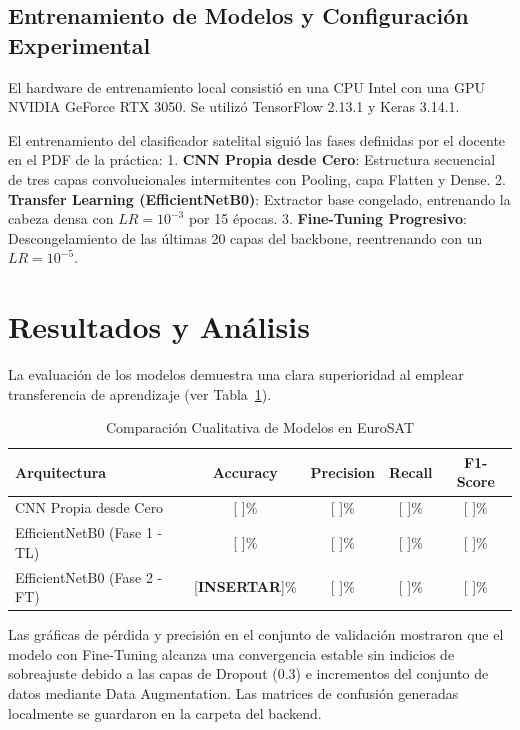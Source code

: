 \documentclass[conference,onecolumn]{IEEEtran}
\begin{document}
\subsection{Entrenamiento de Modelos y Configuración Experimental}
El hardware de entrenamiento local consistió en una CPU Intel con una GPU NVIDIA GeForce RTX 3050. Se utilizó TensorFlow 2.13.1 y Keras 3.14.1.

El entrenamiento del clasificador satelital siguió las fases definidas por el docente en el PDF de la práctica:
1.  \textbf{CNN Propia desde Cero}: Estructura secuencial de tres capas convolucionales intermitentes con Pooling, capa Flatten y Dense.
2.  \textbf{Transfer Learning (EfficientNetB0)}: Extractor base congelado, entrenando la cabeza densa con $LR = 10^{-3}$ por 15 épocas.
3.  \textbf{Fine-Tuning Progresivo}: Descongelamiento de las últimas 20 capas del backbone, reentrenando con un $LR = 10^{-5}$.

\section{Resultados y Análisis}

La evaluación de los modelos demuestra una clara superioridad al emplear transferencia de aprendizaje (ver Tabla~\ref{tab:comparison}).

\begin{table}[h]
\centering
\caption{Comparación Cualitativa de Modelos en EuroSAT}
\label{tab:comparison}
\begin{tabular}{lcccc}
\toprule
\textbf{Arquitectura} & \textbf{Accuracy} & \textbf{Precision} & \textbf{Recall} & \textbf{F1-Score} \\
\midrule
CNN Propia desde Cero & [ ]\% & [ ]\% & [ ]\% & [ ]\% \\
EfficientNetB0 (Fase 1 - TL) & [ ]\% & [ ]\% & [ ]\% & [ ]\% \\
EfficientNetB0 (Fase 2 - FT) & [\textbf{INSERTAR}]\% & [ ]\% & [ ]\% & [ ]\% \\
\bottomrule
\end{tabular}
\end{table}

Las gráficas de pérdida y precisión en el conjunto de validación mostraron que el modelo con Fine-Tuning alcanza una convergencia estable sin indicios de sobreajuste debido a las capas de Dropout (0.3) e incrementos del conjunto de datos mediante Data Augmentation. Las matrices de confusión generadas localmente se guardaron en la carpeta del backend.
\end{document}
